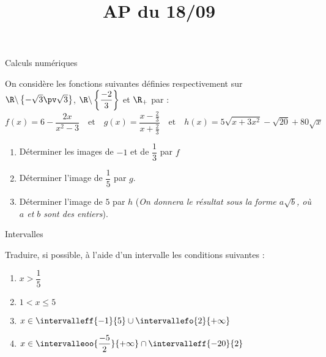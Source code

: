 \documentclass[french,onlymath]{beamer}
\title{AP du 18/09}
\author{\seconde 2}\institute{Lycée Jean Pierre Timbaud}
\date{}
\begin{document}



\begin{frame}
 \titlepage
\end{frame}
\begin{frame}{Calculs numériques}

On considère les fonctions suivantes définies respectivement sur $\R\backslash\left\{-\sqrt{3}\pv \sqrt{3}\right\}$,  $\R\backslash\left\{\dfrac{-2}{3}\right\}$ et   $\R_+$ par :
\[f(x)=6-\frac{2x}{x^2-3}\quad\text{et}\quad g(x)=\frac{x-\frac{2}{3}}{x+\frac{2}{3}}\quad\text{et}\quad h(x)=5\sqrt{x+3x^2}-\sqrt{20}+80\sqrt{x}\]

\begin{enumerate}[\bf 1.]

\item Déterminer les images de $-1$ et de $\dfrac{1}{3}$ par $f$

\item Déterminer l'image de $\dfrac{1}{5}$ par $g$.

\item Déterminer l'image de $5$ par $h$ (\textit{On donnera le résultat sous la forme $a\sqrt{b}$, où $a$ et $b$ sont des entiers}).

\end{enumerate}
\end{frame}
\begin{frame}{Intervalles}

Traduire, si possible, à l'aide d'un intervalle les conditions suivantes :

\begin{enumerate}[\bf 1.]
\item $x>\dfrac{1}{5}$

\item $1<x\leq 5$

\item $x\in \intervalleff{-1}{5}\cup\intervallefo{2}{+\infty}$

\item $x\in \intervalleoo{\dfrac{-5}{2}}{+\infty}\cap \intervalleff{-20}{2}$

\end{enumerate}



\end{frame}
\end{document}
